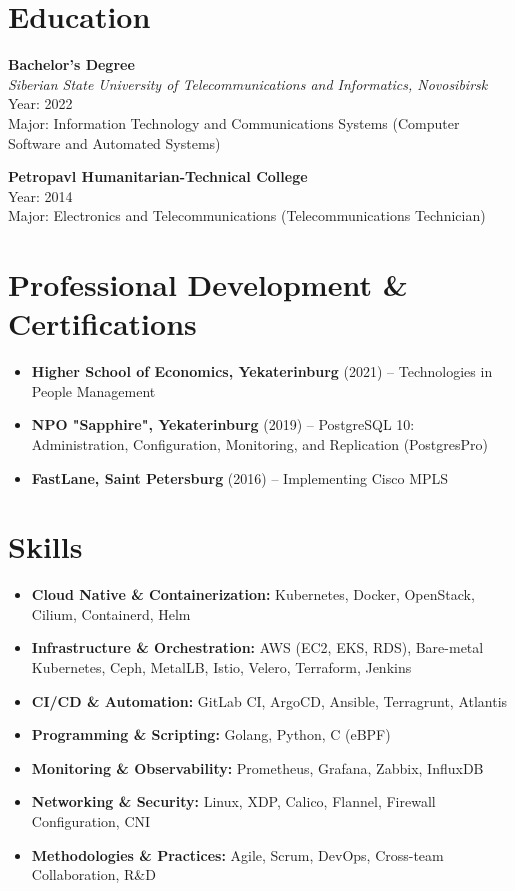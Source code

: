 \documentclass[12pt,a4paper]{article}
\begin{document}
\section*{Education}

\textbf{Bachelor’s Degree}\\
\textit{Siberian State University of Telecommunications and Informatics, Novosibirsk}\\
Year: 2022\\
Major: Information Technology and Communications Systems (Computer Software and Automated Systems)

\vspace{6pt}
\textbf{Petropavl Humanitarian-Technical College}\\
Year: 2014\\
Major: Electronics and Telecommunications (Telecommunications Technician)

\section*{Professional Development \& Certifications}

\begin{itemize}
    \item \textbf{Higher School of Economics, Yekaterinburg} (2021) – Technologies in People Management
    \item \textbf{NPO "Sapphire", Yekaterinburg} (2019) – PostgreSQL 10: Administration, Configuration, Monitoring, and Replication (PostgresPro)
    \item \textbf{FastLane, Saint Petersburg} (2016) – Implementing Cisco MPLS
\end{itemize}

\section*{Skills}
\begin{itemize}
    \item \textbf{Cloud Native \& Containerization:} Kubernetes, Docker, OpenStack, Cilium, Containerd, Helm
    \item \textbf{Infrastructure \& Orchestration:} AWS (EC2, EKS, RDS), Bare-metal Kubernetes, Ceph, MetalLB, Istio, Velero, Terraform, Jenkins
    \item \textbf{CI/CD \& Automation:} GitLab CI, ArgoCD, Ansible, Terragrunt, Atlantis
    \item \textbf{Programming \& Scripting:} Golang, Python, C (eBPF)
    \item \textbf{Monitoring \& Observability:} Prometheus, Grafana, Zabbix, InfluxDB
    \item \textbf{Networking \& Security:} Linux, XDP, Calico, Flannel, Firewall Configuration, CNI
    \item \textbf{Methodologies \& Practices:} Agile, Scrum, DevOps, Cross-team Collaboration, R\&D
\end{itemize}
\end{document}
